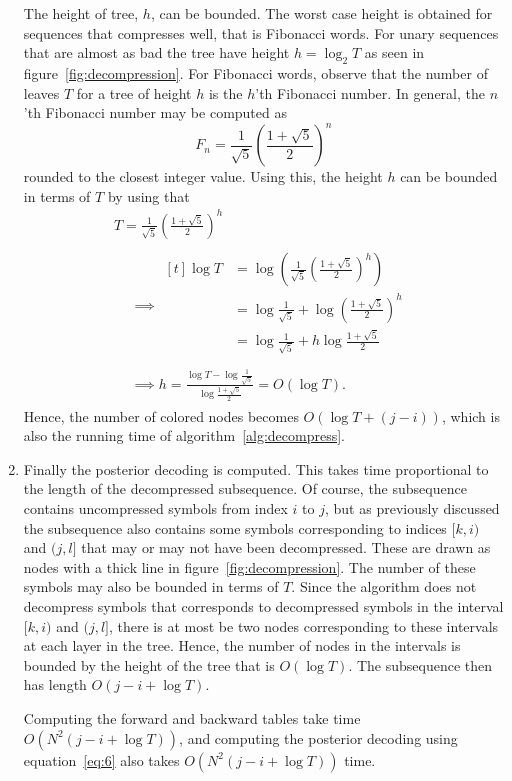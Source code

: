 \begin{enumerate}
  The height of tree, $h$, can be bounded. The worst case height is obtained
  for sequences that compresses well, that is Fibonacci words. For unary
  sequences that are almost as bad the tree have height $h = \log_2 T$ as seen
  in figure~\ref{fig:decompression}. For Fibonacci words, observe that the
  number of leaves $T$ for a tree of height $h$ is the $h$'th Fibonacci number.
  In general, the $n$'th Fibonacci number may be computed as
  \begin{equation*}
    F_n = \frac{1}{\sqrt{5}}
    {\left(
        \frac{1 + \sqrt{5}}{2}
      \right)}^n
  \end{equation*}
  rounded to the closest integer value. Using this, the height $h$ can be
  bounded in terms of $T$ by using that
  \begin{gather*}
      T = \frac{1}{\sqrt{5}} {\left( \frac{1 + \sqrt{5}}{2} \right)}^h \\
      \begin{aligned}
        &\implies
        \begin{aligned}[t]
          \log T & = \log \left( \frac{1}{\sqrt{5}} {\left( \frac{1 + \sqrt{5}}{2} \right)}^h \right) \\
                 & = \log \frac{1}{\sqrt{5}} + \log {\left( \frac{1 + \sqrt{5}}{2} \right)}^h         \\
                 & = \log \frac{1}{\sqrt{5}} + h \log  \frac{1 + \sqrt{5}}{2}                         \\
        \end{aligned} \\
        &\implies h = \frac{\log T - \log \frac{1}{\sqrt{5}}}{\log \frac{1 + \sqrt{5}}{2}} = O\left(\log T\right).
      \end{aligned}
  \end{gather*}
  Hence, the number of colored nodes becomes $O\left(\log T + (j - i)\right)$, which is
  also the running time of algorithm~\ref{alg:decompress}.

\item Finally the posterior decoding is computed. This takes time proportional
  to the length of the decompressed subsequence. Of course, the subsequence
  contains uncompressed symbols from index $i$ to $j$, but as previously
  discussed the subsequence also contains some symbols corresponding to indices
  $[k, i)$ and $(j, l]$ that may or may not have been decompressed. These are
  drawn as nodes with a thick line in figure~\ref{fig:decompression}. The
  number of these symbols may also be bounded in terms of $T$. Since the
  algorithm does not decompress symbols that corresponds to decompressed
  symbols in the interval $[k, i)$ and $(j, l]$, there is at most be two nodes
  corresponding to these intervals at each layer in the tree. Hence, the number
  of nodes in the intervals is bounded by the height of the tree that is
  $O\left(\log T\right)$. The subsequence then has length $O\left(j - i + \log T\right)$.

  Computing the forward and backward tables take time
  $O\left(N^2 (j - i + \log T)\right)$, and computing the posterior decoding using
  equation~\eqref{eq:6} also takes $O\left(N^2 (j - i + \log T)\right)$ time.
\end{enumerate}
